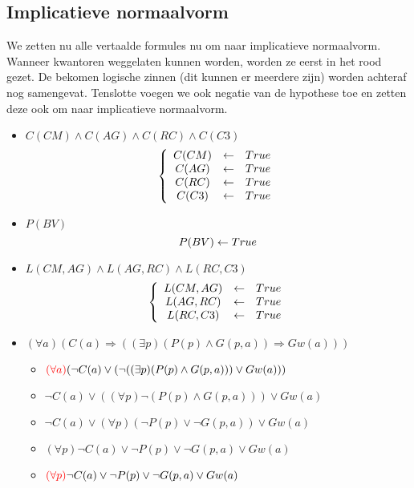 \documentclass[alternative-exam.tex]{subfiles}
\begin{document}
\subsection{Implicatieve normaalvorm}
We zetten nu alle vertaalde formules nu om naar implicatieve normaalvorm.
Wanneer kwantoren weggelaten kunnen worden, worden ze eerst in het rood gezet. De bekomen logische zinnen (dit kunnen er meerdere zijn) worden achteraf nog samengevat. Tenslotte voegen we ook negatie van de hypothese toe en zetten deze ook om naar implicatieve normaalvorm.
\begin{itemize}
\item $C(CM)\wedge C(AG)\wedge C(RC)\wedge C(C3)$
\[
\left\{
\begin{array}{c c c}
C(CM) &\leftarrow& True\\
C(AG) &\leftarrow& True\\
C(RC) &\leftarrow& True\\
C(C3) &\leftarrow& True\\
\end{array}
\right.
\]

\item $P(BV)$
\[
P(BV) \leftarrow True\\
\]

\item $L(CM,AG) \wedge L(AG,RC) \wedge L(RC,C3)$
\[
\left\{
\begin{array}{c c c}
L(CM,AG) &\leftarrow& True\\
L(AG,RC) &\leftarrow& True\\
L(RC,C3) &\leftarrow& True\\
\end{array}
\right.
\]

\item $(\forall a)(C(a) \Rightarrow ((\exists p) (P(p) \wedge G(p,a)) \Rightarrow Gw(a)))$
\begin{itemize}
\item $ {\color{red}(\forall a)} (\neg C(a) \vee (\neg ((\exists p)(P(p)\wedge G(p,a))) \vee Gw(a)))$

\item $\neg C(a) \vee ((\forall p)\neg(P(p)\wedge G(p,a))) \vee Gw(a)$

\item $\neg C(a) \vee (\forall p)(\neg P(p)\vee \neg G(p,a)) \vee Gw(a)$

\item $(\forall p) \neg C(a) \vee \neg P(p) \vee \neg G(p,a) \vee Gw(a)$

\item ${\color{red}(\forall p)} \neg C(a) \vee \neg P(p) \vee \neg G(p,a) \vee Gw(a)$


\end{itemize}
\end{itemize}
\end{document}
